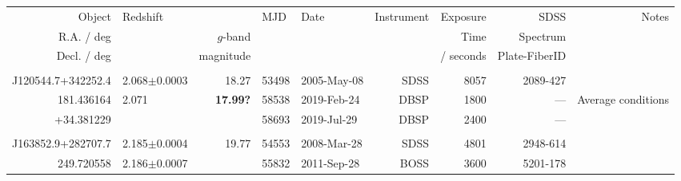 \documentclass[a4paper,fleqn,usenatbib]{mnras}
\begin{document}
\begin{table}
  \centering
  \begin{tabular}{r l   r ll   r r r r}
    \hline 
    \hline 
    Object                           & \multirow{3}{*}{Redshift}  &                       & \multirow{3}{*}{MJD} & \multirow{3}{*}{Date} & \multirow{3}{*}{Instrument}  & Exposure      & SDSS                        & \multirow{3}{*}{Notes} \\
    R.A. / deg                     &                                         &   {$g$-band}   &                                 &                                  &                                               &  Time           & Spectrum                 & \\
    Decl. / deg                   &                                         &    magnitude   &                                &                                   &                                              &  / seconds    & Plate-FiberID  & \\
    \hline  
                                         &                                         &                        &                &                            &                    &                              &                              & \\
    J120544.7+342252.4   & 2.068$\pm$0.0003         &   18.27             &  53498   &  2005-May-08   & SDSS             &  8057                  & 2089-427             & \\
    181.436164                  & 2.071                              & {\bf 17.99?}     &  58538   &  2019-Feb-24    & DBSP            &  1800                  &  ---                      &  Average conditions \\
    +34.381229                 &                                        &                          &  58693   &  2019-Jul-29     & DBSP            &  2400                   &  ---                      &   \\
                                         &                                       &                          &                &                          &                    &                               &                              & \\
    J163852.9+282707.7   & 2.185$\pm$0.0004       &   19.77              &  54553    & 2008-Mar-28     & SDSS           &   4801                    &  2948-614              & \\
    249.720558	                 &  2.186$\pm$0.0007     &                          &  55832    & 2011-Sep-28     & BOSS            &   3600                   &  5201-178            & \\

\end{tabular}
\end{table}
\end{document}
